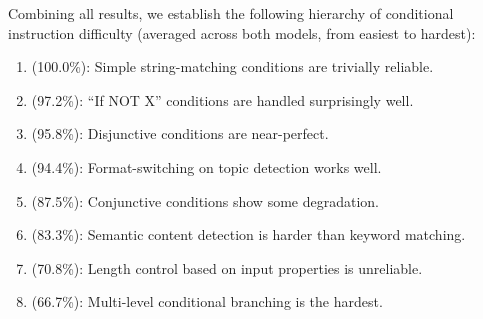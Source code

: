 Combining all results, we establish the following hierarchy of conditional instruction difficulty (averaged across both models, from easiest to hardest):

\begin{enumerate}[leftmargin=*,itemsep=0pt,topsep=0pt]
    \item {} (100.0\%): Simple string-matching conditions are trivially reliable.
    \item {} (97.2\%): ``If NOT X'' conditions are handled surprisingly well.
    \item {} (95.8\%): Disjunctive conditions are near-perfect.
    \item {} (94.4\%): Format-switching on topic detection works well.
    \item {} (87.5\%): Conjunctive conditions show some degradation.
    \item {} (83.3\%): Semantic content detection is harder than keyword matching.
    \item {} (70.8\%): Length control based on input properties is unreliable.
    \item {} (66.7\%): Multi-level conditional branching is the hardest.
\end{enumerate}
